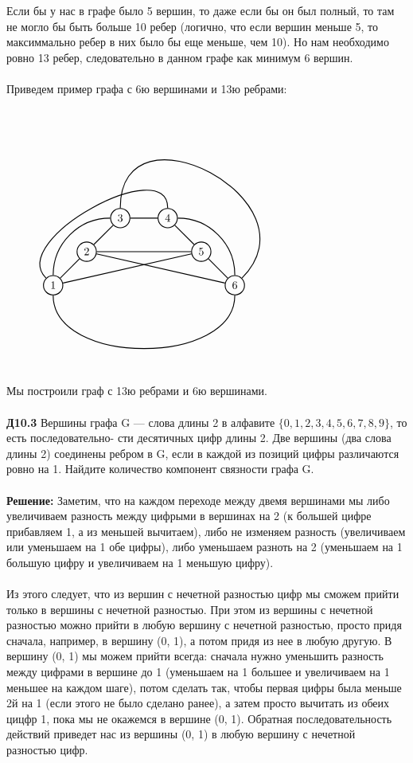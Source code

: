 \documentclass[a4paper, 12pt]{article}
\begin{document}
    \\
    \\ Если бы у нас в графе было 5 вершин, то даже если бы он был полный, то там не могло бы быть больше 10 ребер (логично, что если вершин меньше 5, то максиммально ребер в них было бы еще меньше, чем 10). Но нам необходимо ровно 13 ребер, следовательно в данном графе как минимум 6 вершин.
    \\
    \\ Приведем пример графа с 6ю вершинами и 13ю ребрами:
    \\
    $\begin{tikzpicture}[node distance={15mm}, thick, main/.style = {draw, circle}] 
        \node[main] (1) {$1$}; 
        \node[main] (2) [above right of=1] {$2$}; 
        \node[main] (3) [above right of=2] {$3$}; 
        \node[main] (4) [right of=3] {$4$}; 
        \node[main] (5) [below right of=4] {$5$}; 
        \node[main] (6) [below right of=5] {$6$}; 
        \draw[-] (1) -- (2); 
        \draw(1) to [out=90, in=180,looseness=1] (3); 
        \draw(6) to [out=90, in=0,looseness=1] (4); 
        \draw(1) to [out=135, in=90,looseness=1] (4);
        \draw(6) to [out=45, in=90,looseness=2] (3);
        \draw[-] (1) -- (5);
        \draw[-] (3) -- (4);
        \draw[-] (5) -- (4);
        \draw[-] (5) -- (6);
        \draw(6) to [out=270, in=270,looseness=1] (1);
        \draw[-] (2) -- (3);
        \draw[-] (2) -- (5);
        \draw[-] (2) -- (6);
      \end{tikzpicture}$
    \\
    \\ Мы построили граф с 13ю ребрами и 6ю вершинами.
    \\
    \\ \textbf{Д10.3} Вершины графа G — слова длины 2 в алфавите $\{0, 1, 2, 3, 4, 5, 6, 7, 8, 9\}$, то есть последовательно-
    сти десятичных цифр длины 2. Две вершины (два слова длины 2) соединены ребром в G, если в каждой из позиций цифры различаются ровно на 1. Найдите количество компонент связности графа G.
    \\
    \\ \textbf{Решение: } Заметим, что на каждом переходе между двемя вершинами мы либо увеличиваем разность между цифрыми в вершинах на 2 (к большей цифре прибавляем 1, а из меньшей вычитаем), либо не изменяем разность (увеличиваем или уменьшаем на 1 обе цифры), либо уменьшаем разноть на 2 (уменьшаем на 1 большую цифру и увеличиваем на 1 меньшую цифру).
    \\
    \\ Из этого следует, что из вершин с нечетной разностью цифр мы сможем прийти только в вершины с нечетной разностью. При этом из вершины с нечетной разностью можно прийти в любую вершину с нечетной разностью, просто придя сначала, например, в вершину (0, 1), а потом придя из нее в любую другую. В вершину (0, 1) мы можем прийти всегда: сначала нужно уменьшить разность между цифрами в вершине до 1 (уменьшаем на 1 большее и увеличиваем на 1 меньшее на каждом шаге), потом сделать так, чтобы первая цифры была меньше 2й на 1 (если этого не было сделано ранее), а затем просто вычитать из обеих цицфр 1, пока мы не окажемся в вершине (0, 1). Обратная последовательность действий приведет нас из вершины (0, 1) в любую вершину с нечетной разностью цифр.
\end{document}
